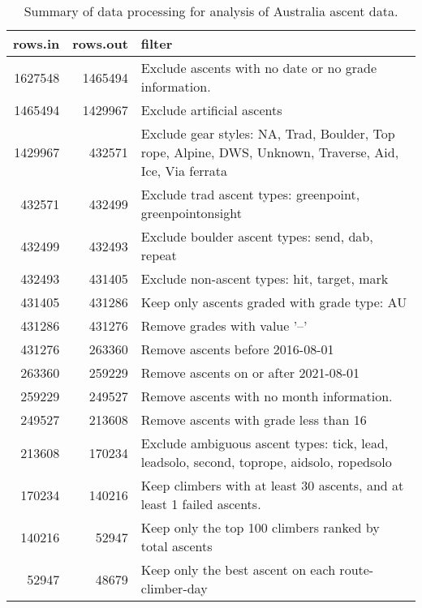 \begin{table}[ht]
\centering
\begingroup\fontsize{9pt}{10pt}\selectfont
\begin{tabular}{r r p{11cm}}
  \hline
{\bf rows.in} & {\bf rows.out} & {\bf filter} \\ 
  \hline
1627548 & 1465494 & Exclude ascents with no date or no grade information. \\ 
  1465494 & 1429967 & Exclude artificial ascents \\ 
  1429967 & 432571 & Exclude gear styles: NA, Trad, Boulder, Top rope, Alpine, DWS, Unknown, Traverse, Aid, Ice, Via ferrata \\ 
  432571 & 432499 & Exclude trad ascent types: greenpoint, greenpointonsight \\ 
  432499 & 432493 & Exclude boulder ascent types: send, dab, repeat \\ 
  432493 & 431405 & Exclude non-ascent types: hit, target, mark \\ 
  431405 & 431286 & Keep only ascents graded with grade type: AU \\ 
  431286 & 431276 & Remove grades with value '--' \\ 
  431276 & 263360 & Remove ascents before 2016-08-01 \\ 
  263360 & 259229 & Remove ascents on or after 2021-08-01 \\ 
  259229 & 249527 & Remove ascents with no month information. \\ 
  249527 & 213608 & Remove ascents with grade less than 16 \\ 
  213608 & 170234 & Exclude ambiguous ascent types: tick, lead, leadsolo, second, toprope, aidsolo, ropedsolo \\ 
  170234 & 140216 & Keep climbers with at least 30 ascents, and at least 1 failed ascents. \\ 
  140216 & 52947 & Keep only the top 100 climbers ranked by total ascents\\ 
  52947 & 48679 & Keep only the best ascent on each route-climber-day \\ 
   \hline
\end{tabular}
\endgroup
\caption{Summary of data processing for analysis of Australia ascent data.} 
\label{table-data-processing-aus}
\end{table}
